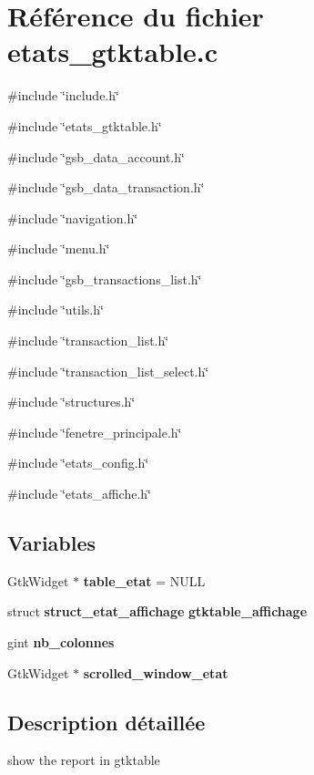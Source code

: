 \section{Référence du fichier etats\_\-gtktable.c}
\label{etats__gtktable_8c}
{\ttfamily \#include \char`\"{}include.h\char`\"{}}\par
{\ttfamily \#include \char`\"{}etats\_\-gtktable.h\char`\"{}}\par
{\ttfamily \#include \char`\"{}gsb\_\-data\_\-account.h\char`\"{}}\par
{\ttfamily \#include \char`\"{}gsb\_\-data\_\-transaction.h\char`\"{}}\par
{\ttfamily \#include \char`\"{}navigation.h\char`\"{}}\par
{\ttfamily \#include \char`\"{}menu.h\char`\"{}}\par
{\ttfamily \#include \char`\"{}gsb\_\-transactions\_\-list.h\char`\"{}}\par
{\ttfamily \#include \char`\"{}utils.h\char`\"{}}\par
{\ttfamily \#include \char`\"{}transaction\_\-list.h\char`\"{}}\par
{\ttfamily \#include \char`\"{}transaction\_\-list\_\-select.h\char`\"{}}\par
{\ttfamily \#include \char`\"{}structures.h\char`\"{}}\par
{\ttfamily \#include \char`\"{}fenetre\_\-principale.h\char`\"{}}\par
{\ttfamily \#include \char`\"{}etats\_\-config.h\char`\"{}}\par
{\ttfamily \#include \char`\"{}etats\_\-affiche.h\char`\"{}}\par
\subsection*{Variables}
\begin{DoxyCompactItemize}
\item 
GtkWidget $\ast$ {\bf table\_\-etat} = NULL
\item 
struct {\bf struct\_\-etat\_\-affichage} {\bf gtktable\_\-affichage}
\item 
gint {\bf nb\_\-colonnes}
\item 
GtkWidget $\ast$ {\bf scrolled\_\-window\_\-etat}
\end{DoxyCompactItemize}


\subsection{Description détaillée}
show the report in gtktable 

